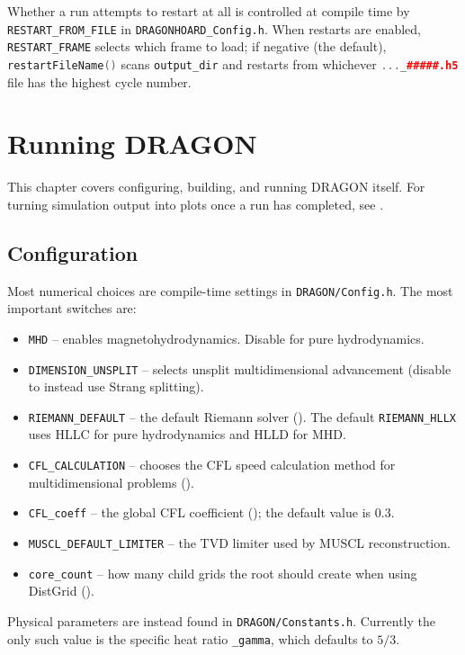 \documentclass[11pt]{report}
\newcommand{\cpp}[1]{\lstinline[language=C++]{#1}}
\newcommand{\bash}[1]{\lstinline[language=bash]{#1}}
\begin{document}
Whether a run attempts to restart at all is controlled at compile time by \cpp{RESTART_FROM_FILE} in \bash{DRAGONHOARD_Config.h}.
When restarts are enabled, \cpp{RESTART_FRAME} selects which frame to load; if negative (the default), \cpp{restartFileName()} scans \cpp{output_dir} and restarts from whichever \cpp{..._#####.h5} file has the highest cycle number. 



\chapter{Running DRAGON}
\label{ch:usage}

This chapter covers configuring, building, and running DRAGON itself. For turning simulation output into plots once a run has completed, see .

\section{Configuration}
\label{sec:usage-config}

Most numerical choices are compile-time settings in \bash{DRAGON/Config.h}. The most important switches are:

\begin{itemize}
\item \cpp{MHD} -- enables magnetohydrodynamics. Disable for pure hydrodynamics.
\item \cpp{DIMENSION_UNSPLIT} -- selects unsplit multidimensional advancement (disable to instead use Strang splitting).
\item \cpp{RIEMANN_DEFAULT} -- the default Riemann solver (). The default \cpp{RIEMANN_HLLX} uses HLLC for pure hydrodynamics and HLLD for MHD.
\item \cpp{CFL_CALCULATION} -- chooses the CFL speed calculation method for multidimensional problems ().
\item \cpp{CFL_coeff} -- the global CFL coefficient (); the default value is $0.3$.
\item \cpp{MUSCL_DEFAULT_LIMITER} -- the TVD limiter used by MUSCL reconstruction.
\item \cpp{core_count} -- how many child grids the root should create when using DistGrid ().
\end{itemize}

Physical parameters are instead found in \bash{DRAGON/Constants.h}. Currently the only such value is the specific heat ratio \cpp{_gamma}, which defaults to $5/3$.
\end{document}

